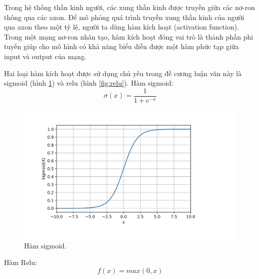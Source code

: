 \begin{itemize}
    Trong hệ thống thần kinh người, các xung thần kinh được truyền giữa các nơ-ron thông qua các axon. Để  mô phỏng quá trình truyền xung thần kinh của người qua axon theo một tỷ lệ, người ta dùng hàm kích hoạt (activation function). Trong một mạng nơ-ron nhân tạo, hàm kích hoạt đóng vai trò là thành phần phi tuyến giúp cho mô hình có khả năng biểu diễn được một hàm phức tạp giữa input và output của mạng.
     
    Hai loại hàm kích hoạt được sử dụng chủ yếu trong đề cương luận văn này là sigmoid (hình \ref{fig:sigmoid}) và relu (hình \ref{fig:relu}).
    Hàm sigmoid:
    \begin{equation}
        \sigma(x) = \frac{1}{1+e^{-x}}
    \end{equation}    

    \begin{figure}[t]
        \begin{center}
            \includegraphics[scale=0.2]{asset/image/sigmoid.png}
            \caption{Hàm sigmoid. }
            \label{fig:sigmoid}
        \end{center}
    \end{figure}


    Hàm Relu:
    \begin{equation}
        f(x) = max(0,x)
    \end{equation}    


\end{itemize}
